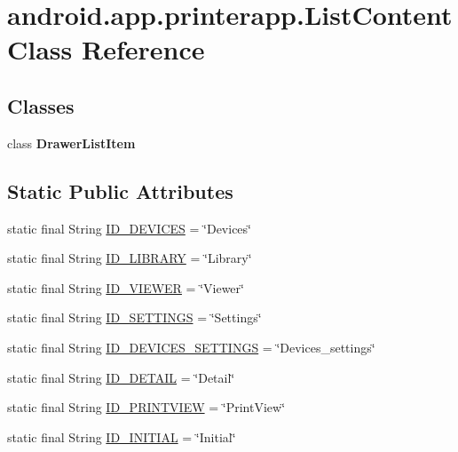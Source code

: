\hypertarget{classandroid_1_1app_1_1printerapp_1_1_list_content}{}\section{android.\+app.\+printerapp.\+List\+Content Class Reference}
\label{classandroid_1_1app_1_1printerapp_1_1_list_content}
\subsection*{Classes}
\begin{DoxyCompactItemize}
\item 
class {\bfseries Drawer\+List\+Item}
\end{DoxyCompactItemize}
\subsection*{Static Public Attributes}
\begin{DoxyCompactItemize}
\item 
static final String \hyperlink{classandroid_1_1app_1_1printerapp_1_1_list_content_ae28b6c0a83f3305fb20528009e698966}{I\+D\+\_\+\+D\+E\+V\+I\+C\+ES} = \char`\"{}Devices\char`\"{}
\item 
static final String \hyperlink{classandroid_1_1app_1_1printerapp_1_1_list_content_a99d96c7b40e3eae6af9eaa58bb7b9433}{I\+D\+\_\+\+L\+I\+B\+R\+A\+RY} = \char`\"{}Library\char`\"{}
\item 
static final String \hyperlink{classandroid_1_1app_1_1printerapp_1_1_list_content_abaddb86a7653f93885a0bb88f75de461}{I\+D\+\_\+\+V\+I\+E\+W\+ER} = \char`\"{}Viewer\char`\"{}
\item 
static final String \hyperlink{classandroid_1_1app_1_1printerapp_1_1_list_content_a6691ab08927f7e7da358fe211a5cd9da}{I\+D\+\_\+\+S\+E\+T\+T\+I\+N\+GS} = \char`\"{}Settings\char`\"{}
\item 
static final String \hyperlink{classandroid_1_1app_1_1printerapp_1_1_list_content_a88cb7325290b17b8ae39f095065a1d6c}{I\+D\+\_\+\+D\+E\+V\+I\+C\+E\+S\+\_\+\+S\+E\+T\+T\+I\+N\+GS} = \char`\"{}Devices\+\_\+settings\char`\"{}
\item 
static final String \hyperlink{classandroid_1_1app_1_1printerapp_1_1_list_content_a813055b2b27ef9b10b65b11c99743466}{I\+D\+\_\+\+D\+E\+T\+A\+IL} = \char`\"{}Detail\char`\"{}
\item 
static final String \hyperlink{classandroid_1_1app_1_1printerapp_1_1_list_content_a40d36d41d1acf4b633ade2da7f7e20ba}{I\+D\+\_\+\+P\+R\+I\+N\+T\+V\+I\+EW} = \char`\"{}Print\+View\char`\"{}
\item 
static final String \hyperlink{classandroid_1_1app_1_1printerapp_1_1_list_content_a754f2679efcb3ce00ad89d62d216f08d}{I\+D\+\_\+\+I\+N\+I\+T\+I\+AL} = \char`\"{}Initial\char`\"{}
\end{DoxyCompactItemize}


